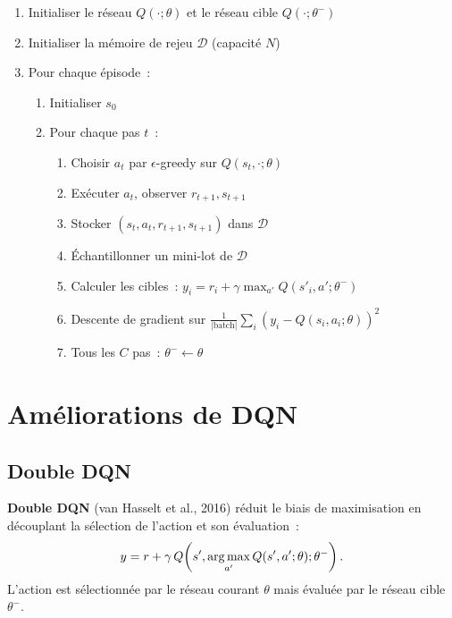 \begin{algorithme}[title=\textbf{DQN}]
\begin{enumerate}
    \item Initialiser le r\'eseau $Q(\cdot; \theta)$ et le r\'eseau cible $Q(\cdot; \theta^-)$
    \item Initialiser la m\'emoire de rejeu $\mathcal{D}$ (capacit\'e $N$)
    \item Pour chaque \'episode~:
    \begin{enumerate}
        \item Initialiser $s_0$
        \item Pour chaque pas $t$~:
        \begin{enumerate}
            \item Choisir $a_t$ par $\epsilon$-greedy sur $Q(s_t, \cdot; \theta)$
            \item Ex\'ecuter $a_t$, observer $r_{t+1}, s_{t+1}$
            \item Stocker $(s_t, a_t, r_{t+1}, s_{t+1})$ dans $\mathcal{D}$
            \item \'Echantillonner un mini-lot de $\mathcal{D}$
            \item Calculer les cibles~: $y_i = r_i + \gamma \max_{a'} Q(s'_i, a'; \theta^-)$
            \item Descente de gradient sur $\frac{1}{|\text{batch}|}\sum_i (y_i - Q(s_i, a_i; \theta))^2$
            \item Tous les $C$ pas~: $\theta^- \leftarrow \theta$
        \end{enumerate}
    \end{enumerate}
\end{enumerate}
\end{algorithme}

\section{Am\'eliorations de DQN}

\subsection{Double DQN}

\begin{definition}
\textbf{Double DQN} (van Hasselt et al., 2016) r\'eduit le biais de maximisation
en d\'ecouplant la s\'election de l'action et son \'evaluation~:
\[
    y = r + \gamma \, Q\!\left(s', \operatorname*{arg\,max}_{a'} Q(s', a'; \theta); \theta^-\right).
\]
L'action est s\'electionn\'ee par le r\'eseau courant $\theta$ mais \'evalu\'ee
par le r\'eseau cible $\theta^-$.
\end{definition}

